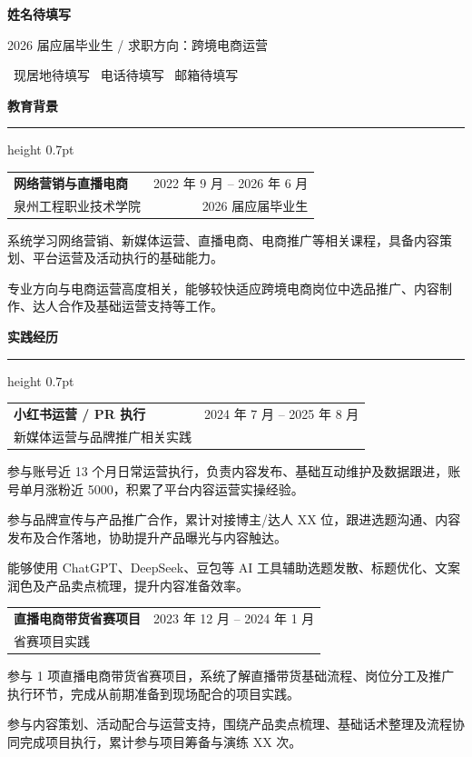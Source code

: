 \documentclass[10pt,a4paper]{article}
\makeatletter
\newcommand{\sectionTitle}[1]{%
  \vspace{12pt}
  {\large\bfseries\color{resumeBlue}#1}\par
  \vspace{5pt}
  {\color{resumeRule}\hrule height 0.7pt}
  \vspace{6pt}
}
\newcommand{\entry}[4]{%
  \begin{tabularx}{\textwidth}{@{}X r@{}}
    {\bfseries #1} & {\color{resumeMuted}#3} \\
    {\color{resumeMuted}#2} & {\color{resumeMuted}#4}
  \end{tabularx}
  \vspace{4pt}
}
\makeatother
\begin{document}
\begin{center}
  {\fontsize{22pt}{28pt}\selectfont\bfseries\color{resumeBlue}姓名待填写}\par
  \vspace{6pt}
  {\large 2026 届应届毕业生 \quad / \quad 求职方向：跨境电商运营}\par
  \vspace{10pt}
  {\faMapMarker* \ 现居地待填写 \qquad
   \faPhone* \ 电话待填写 \qquad
   \faEnvelope \ 邮箱待填写}
\end{center}

\sectionTitle{教育背景}

\entry{网络营销与直播电商}{泉州工程职业技术学院}{2022 年 9 月 -- 2026 年 6 月}{2026 届应届毕业生}
\begin{resumeBullets}
  \item 系统学习网络营销、新媒体运营、直播电商、电商推广等相关课程，具备内容策划、平台运营及活动执行的基础能力。
  \item 专业方向与电商运营高度相关，能够较快适应跨境电商岗位中选品推广、内容制作、达人合作及基础运营支持等工作。
\end{resumeBullets}

\sectionTitle{实践经历}

\entry{小红书运营 / PR 执行}{新媒体运营与品牌推广相关实践}{2024 年 7 月 -- 2025 年 8 月}{}
\begin{resumeBullets}
  \item 参与账号近 13 个月日常运营执行，负责内容发布、基础互动维护及数据跟进，账号单月涨粉近 5000，积累了平台内容运营实操经验。
  \item 参与品牌宣传与产品推广合作，累计对接博主/达人 XX 位，跟进选题沟通、内容发布及合作落地，协助提升产品曝光与内容触达。
  \item 能够使用 ChatGPT、DeepSeek、豆包等 AI 工具辅助选题发散、标题优化、文案润色及产品卖点梳理，提升内容准备效率。
\end{resumeBullets}

\vspace{4pt}
\entry{直播电商带货省赛项目}{省赛项目实践}{2023 年 12 月 -- 2024 年 1 月}{}
\begin{resumeBullets}
  \item 参与 1 项直播电商带货省赛项目，系统了解直播带货基础流程、岗位分工及推广执行环节，完成从前期准备到现场配合的项目实践。
  \item 参与内容策划、活动配合与运营支持，围绕产品卖点梳理、基础话术整理及流程协同完成项目执行，累计参与项目筹备与演练 XX 次。
\end{resumeBullets}
\end{document}
